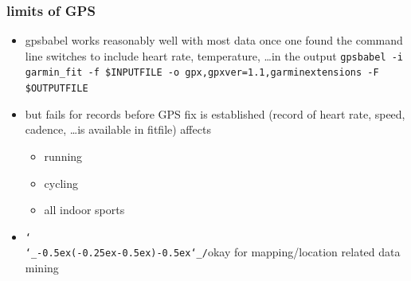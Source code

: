 \documentclass[table,xcolor=dvipsnames,professionalfonts]{beamer}
\def\shrug{\texttt{\raisebox{0.75em}{\char`\_}\char`\\\char`\_\kern-0.5ex(\kern-0.25ex\raisebox{0.25ex}{\rotatebox{45}{\raisebox{-.75ex}"\kern-1.5ex\rotatebox{-90})}}\kern-0.5ex)\kern-0.5ex\char`\_/\raisebox{0.75em}{\char`\_}}}
\begin{document}
\begin{frame}
  \frametitle{limits of GPS}
  \begin{itemize}
      \item gpsbabel works reasonably well with most data
        \newline once one found the command line switches to include heart rate, temperature, \dots in the output
        \newline \texttt{gpsbabel -i garmin\_fit -f \$INPUTFILE -o gpx,gpxver=1.1,garminextensions -F \$OUTPUTFILE}
        \item but fails for records before GPS fix is established
          \newline (record of heart rate, speed, cadence, \dots is available in fitfile)
        \newline affects
        \begin{itemize}
            \item running
            \item cycling
            \item all indoor sports
        \end{itemize}
      \item \shrug okay for mapping/location related data mining
  \end{itemize}
\end{frame}
\end{document}

